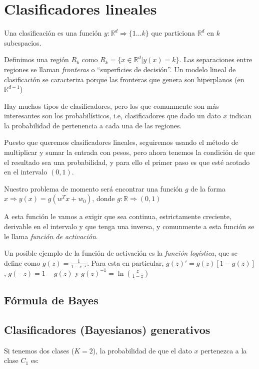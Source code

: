 \section{Clasificadores lineales}
Una clasificación es una función $y: \mathbb{R}^d \Rightarrow \{1 \dots k\}$
que particiona $\mathbb{R}^d$ en $k$ subespacios.

Definimos una región $R_k$ como $R_k = \{x \in \mathbb{R}^d | y(x) = k \}$. Las
separaciones entre regiones se llaman \textit{fronteras} o ``superficies
de decisión''. Un modelo lineal de clasificación se caracteriza porque las
fronteras que genera son hiperplanos (en $\mathbb{R}^{d - 1}$)

Hay muchos tipos de clasificadores, pero los que comunmente son más
interesantes son los probabilísticos, i.e, clasificadores que dado un
dato $x$ indican la probabilidad de pertenencia a cada una de las regiones.

Puesto que queremos clasificadores lineales, seguiremos usando el método de
multiplicar y sumar la entrada con pesos, pero ahora tenemos la condición de
que el resultado sea una probabilidad, y para ello el primer paso es que esté
acotado en el intervalo $(0,1)$.

Nuestro problema de momento será encontrar una función $g$ de la forma
$x \Rightarrow y(x) = g(w^Tx + w_0)$, donde $g: \mathbb{R} \Rightarrow (0,1)$

A esta función le vamos a exigir que sea continua, estrictamente creciente,
derivable en el intervalo y que tenga una inversa, y comunmente a esta función
se le llama \textit{función de activación}.

Un posible ejemplo de la función de activación es la \textit{función logística},
que se define como $g(z) = \frac{1}{1 - e^{-z}}$. Para esta en particular, $g(z)' = g(z) [1 - g(z)]$, $g(-z) =   1 - g(z)$ y $g(z)^{-1} = \ln(\frac{z}{1 - z})$

\subsection{Fórmula de Bayes}



\subsection{Clasificadores (Bayesianos) generativos}
Si tenemos dos clases ($K = 2$), la probabilidad de que el dato
$x$ pertenezca a la clase $C_1$ es:

